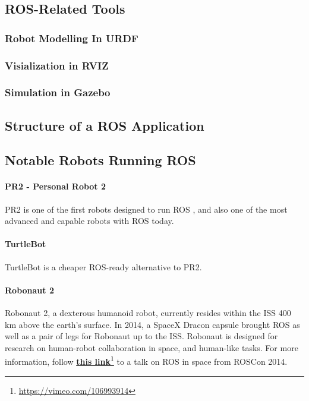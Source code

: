 \subsection{ROS-Related Tools}

\subsubsection{Robot Modelling In URDF}

\subsubsection{Visialization in RVIZ}

\subsubsection{Simulation in Gazebo}

\subsection{Structure of a ROS Application}

\subsection{Notable Robots Running ROS}

\paragraph{PR2 - Personal Robot 2}

PR2 is one of the first robots designed to run \ac{ROS} \cite{rosbook15}, and also one of the most advanced and capable robots with \ac{ROS} today. 

\paragraph{TurtleBot} 

TurtleBot is a cheaper ROS-ready alternative to PR2. 

\paragraph{Robonaut 2}

Robonaut 2, a dexterous humanoid robot, currently resides within the \ac{ISS} 400 km above the earth's surface. In 2014, a SpaceX Dracon capsule brought \ac{ROS} as well as a pair of legs for Robonaut up to the \ac{ISS}\cite{ROS_space}. Robonaut is designed for research on human-robot collaboration in space, and human-like tasks. For more information, follow \href{https://vimeo.com/106993914}{\textbf{this link}}\footnote{\url{https://vimeo.com/106993914}} to a talk on \ac{ROS} in space from ROSCon 2014.

